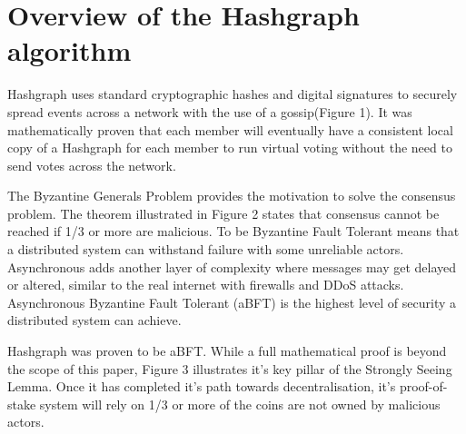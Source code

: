 \section{Overview of the Hashgraph algorithm}



Hashgraph uses standard cryptographic hashes and digital signatures to securely spread events across a network with the use of a gossip(Figure 1).%
It was mathematically proven that each member will eventually have a consistent local copy of a Hashgraph for each member to run virtual voting without the need to send votes across the network\cite{baird2016}.


The Byzantine Generals Problem\cite{shostak1982byzantine} provides the motivation to solve the consensus problem. The theorem illustrated in Figure 2 states that consensus cannot be reached if 1/3 or more are malicious. To be Byzantine Fault Tolerant means that a distributed system can withstand failure with some unreliable actors. Asynchronous adds another layer of complexity where messages may get delayed or altered, similar to the real internet with firewalls and DDoS attacks. Asynchronous Byzantine Fault Tolerant (aBFT) is the highest level of security a distributed system can achieve\cite{coq2018}.


Hashgraph was proven to be aBFT. While a full mathematical proof is beyond the scope of this paper, Figure 3 illustrates it's key pillar of the Strongly Seeing Lemma. Once it has completed it's path towards decentralisation, it's proof-of-stake system will rely on 1/3 or more of the coins are not owned by malicious actors. 

% 



